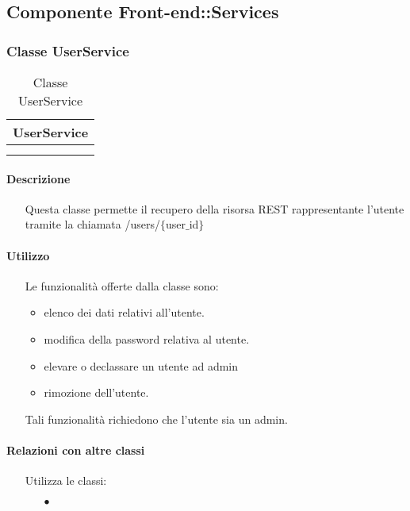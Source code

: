 
\subsection{Componente Front-end::Services}

\subsubsection{Classe UserService}

\begin{table}[ht]
\begin{center}
\bgroup
\setlength{\arrayrulewidth}{0.6mm}
\def\arraystretch{1}
\begin{tabular}{ | p{12cm} | }
\hline
\centerline{\textbf{UserService}}
\\ \hline
 \\ 
\hline
 \\ 
\hline
\end{tabular}
\egroup
\caption{Classe UserService}
\end{center}
\end{table}

\paragraph*{Descrizione}
\begin{itemize}
\item[] Questa classe permette il recupero della risorsa REST rappresentante l'utente tramite la chiamata /users/$\{$user$\_$id$\}$
\end{itemize}

\paragraph*{Utilizzo}
\begin{itemize}
\item[] Le funzionalità offerte dalla classe sono: 
\begin{itemize} 
\item elenco dei dati relativi all'utente. 
\item modifica della password relativa al utente.
\item elevare o declassare un utente ad admin 
\item rimozione dell'utente.
\end{itemize}
Tali funzionalità richiedono che l'utente sia un admin.
\end{itemize}

\paragraph*{Relazioni con altre classi}
\begin{itemize}


\item[] Utilizza le classi:
\begin{itemize}
\item[$\bullet$] 
\end{itemize}
\end{itemize}

